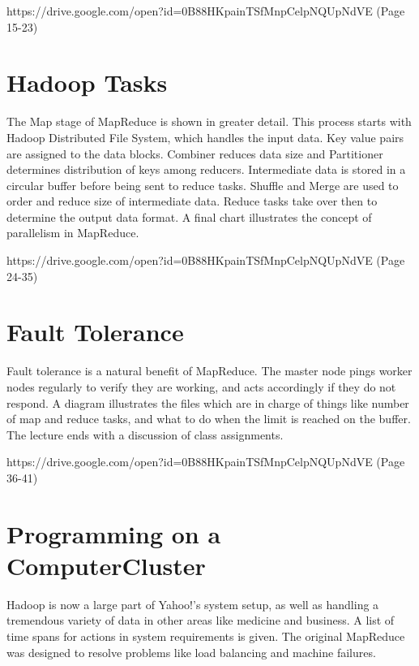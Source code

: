 
{https://drive.google.com/open?id=0B88HKpainTSfMnpCelpNQUpNdVE
  (Page 15-23)}

\section{Hadoop Tasks}

The Map stage of MapReduce is shown in greater detail. This process
starts with Hadoop Distributed File System, which handles the input
data. Key value pairs are assigned to the data blocks. Combiner reduces
data size and Partitioner determines distribution of keys among
reducers. Intermediate data is stored in a circular buffer before being
sent to reduce tasks. Shuffle and Merge are used to order and reduce
size of intermediate data. Reduce tasks take over then to determine the
output data format. A final chart illustrates the concept of parallelism
in MapReduce.


{https://drive.google.com/open?id=0B88HKpainTSfMnpCelpNQUpNdVE
  (Page 24-35)}

\section{Fault Tolerance}

Fault tolerance is a natural benefit of MapReduce. The master node pings
worker nodes regularly to verify they are working, and acts accordingly
if they do not respond. A diagram illustrates the files which are in
charge of things like number of map and reduce tasks, and what to do
when the limit is reached on the buffer. The lecture ends with a
discussion of class assignments.


{https://drive.google.com/open?id=0B88HKpainTSfMnpCelpNQUpNdVE
  (Page 36-41)}

\section{Programming on a ComputerCluster}

Hadoop is now a large part of Yahoo!'s system setup, as well as handling
a tremendous variety of data in other areas like medicine and business.
A list of time spans for actions in system requirements is given. The
original MapReduce was designed to resolve problems like load balancing
and machine failures.


